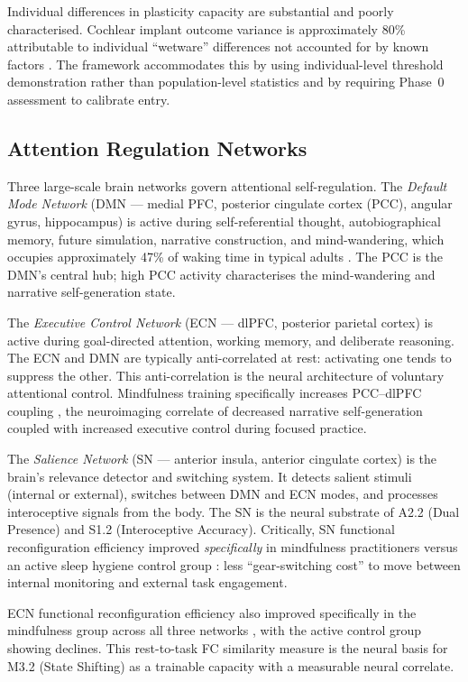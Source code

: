 \documentclass[12pt, a4paper]{article}
\begin{document}
Individual differences in plasticity capacity are substantial and poorly
characterised. Cochlear implant outcome variance is approximately 80\% attributable
to individual ``wetware'' differences not accounted for by known factors
\citep{fallon2009}. The framework accommodates this by using individual-level
threshold demonstration rather than population-level statistics and by requiring
Phase~0 assessment to calibrate entry.

\subsection{Attention Regulation Networks}

Three large-scale brain networks govern attentional self-regulation. The
\emph{Default Mode Network} (DMN --- medial PFC, posterior cingulate cortex (PCC),
angular gyrus, hippocampus) is active during self-referential thought, autobiographical
memory, future simulation, narrative construction, and mind-wandering, which occupies
approximately 47\% of waking time in typical adults \citep{killingsworth2010}. The
PCC is the DMN's central hub; high PCC activity characterises the mind-wandering and
narrative self-generation state.

The \emph{Executive Control Network} (ECN --- dlPFC, posterior parietal cortex) is
active during goal-directed attention, working memory, and deliberate reasoning. The
ECN and DMN are typically anti-correlated at rest: activating one tends to suppress
the other. This anti-correlation is the neural architecture of voluntary attentional
control. Mindfulness training specifically increases PCC--dlPFC coupling
\citep{ganesan2025}, the neuroimaging correlate of decreased narrative self-generation
coupled with increased executive control during focused practice.

The \emph{Salience Network} (SN --- anterior insula, anterior cingulate cortex) is
the brain's relevance detector and switching system. It detects salient stimuli
(internal or external), switches between DMN and ECN modes, and processes
interoceptive signals from the body. The SN is the neural substrate of A2.2
(Dual Presence) and S1.2 (Interoceptive Accuracy). Critically, SN functional
reconfiguration efficiency improved \emph{specifically} in mindfulness practitioners
versus an active sleep hygiene control group \citep{yue2023}: less ``gear-switching
cost'' to move between internal monitoring and external task engagement.

ECN functional reconfiguration efficiency also improved specifically in the
mindfulness group across all three networks \citep{yue2023}, with the active control
group showing declines. This rest-to-task FC similarity measure is the neural basis
for M3.2 (State Shifting) as a trainable capacity with a measurable neural correlate.
\end{document}

